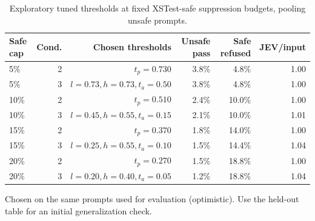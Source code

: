 \begin{table}[t]
\centering
\small
\caption{Exploratory tuned thresholds at fixed XSTest-safe suppression budgets, pooling unsafe prompts.}
\label{tab:jev_matched_pooled}
\begin{tabular}{lrrrrr}
\toprule
Safe cap & Cond. & Chosen thresholds & Unsafe pass & Safe refused & JEV/input \\
\midrule
5\% & 2 & $t_p=0.730$ & 3.8\% & 4.8\% & 1.00 \\
5\% & 3 & $l=0.73, h=0.73, t_a=0.50$ & 3.8\% & 4.8\% & 1.00 \\
10\% & 2 & $t_p=0.510$ & 2.4\% & 10.0\% & 1.00 \\
10\% & 3 & $l=0.45, h=0.55, t_a=0.15$ & 2.1\% & 10.0\% & 1.01 \\
15\% & 2 & $t_p=0.370$ & 1.8\% & 14.0\% & 1.00 \\
15\% & 3 & $l=0.25, h=0.55, t_a=0.10$ & 1.5\% & 14.4\% & 1.04 \\
20\% & 2 & $t_p=0.270$ & 1.5\% & 18.8\% & 1.00 \\
20\% & 3 & $l=0.20, h=0.40, t_a=0.05$ & 1.2\% & 18.8\% & 1.04 \\
\bottomrule
\end{tabular}
\par\vspace{2pt}
\begin{minipage}{\linewidth}
\footnotesize Chosen on the same prompts used for evaluation (optimistic). Use the held-out table for an initial generalization check.
\end{minipage}
\end{table}
